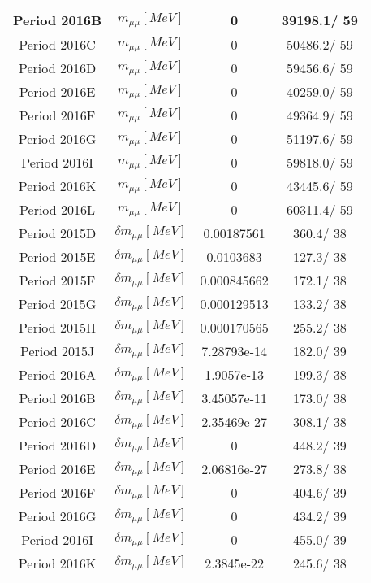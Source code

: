 \documentclass{article}
\begin{document}
\begin{longtable}{c|c|c|c}
\hline
 Period 2016B & $m_{\mu\mu} [MeV]$ & 0 & 39198.1/ 59\\
\hline
 Period 2016C & $m_{\mu\mu} [MeV]$ & 0 & 50486.2/ 59\\
\hline
 Period 2016D & $m_{\mu\mu} [MeV]$ & 0 & 59456.6/ 59\\
\hline
 Period 2016E & $m_{\mu\mu} [MeV]$ & 0 & 40259.0/ 59\\
\hline
 Period 2016F & $m_{\mu\mu} [MeV]$ & 0 & 49364.9/ 59\\
\hline
 Period 2016G & $m_{\mu\mu} [MeV]$ & 0 & 51197.6/ 59\\
\hline
 Period 2016I & $m_{\mu\mu} [MeV]$ & 0 & 59818.0/ 59\\
\hline
 Period 2016K & $m_{\mu\mu} [MeV]$ & 0 & 43445.6/ 59\\
\hline
 Period 2016L & $m_{\mu\mu} [MeV]$ & 0 & 60311.4/ 59\\
\hline
 Period 2015D & $\delta m_{\mu\mu} [MeV]$ & 0.00187561 & 360.4/ 38\\
\hline
 Period 2015E & $\delta m_{\mu\mu} [MeV]$ & 0.0103683 & 127.3/ 38\\
\hline
 Period 2015F & $\delta m_{\mu\mu} [MeV]$ & 0.000845662 & 172.1/ 38\\
\hline
 Period 2015G & $\delta m_{\mu\mu} [MeV]$ & 0.000129513 & 133.2/ 38\\
\hline
 Period 2015H & $\delta m_{\mu\mu} [MeV]$ & 0.000170565 & 255.2/ 38\\
\hline
 Period 2015J & $\delta m_{\mu\mu} [MeV]$ & 7.28793e-14 & 182.0/ 39\\
\hline
 Period 2016A & $\delta m_{\mu\mu} [MeV]$ & 1.9057e-13 & 199.3/ 38\\
\hline
 Period 2016B & $\delta m_{\mu\mu} [MeV]$ & 3.45057e-11 & 173.0/ 38\\
\hline
 Period 2016C & $\delta m_{\mu\mu} [MeV]$ & 2.35469e-27 & 308.1/ 38\\
\hline
 Period 2016D & $\delta m_{\mu\mu} [MeV]$ & 0 & 448.2/ 39\\
\hline
 Period 2016E & $\delta m_{\mu\mu} [MeV]$ & 2.06816e-27 & 273.8/ 38\\
\hline
 Period 2016F & $\delta m_{\mu\mu} [MeV]$ & 0 & 404.6/ 39\\
\hline
 Period 2016G & $\delta m_{\mu\mu} [MeV]$ & 0 & 434.2/ 39\\
\hline
 Period 2016I & $\delta m_{\mu\mu} [MeV]$ & 0 & 455.0/ 39\\
\hline
 Period 2016K & $\delta m_{\mu\mu} [MeV]$ & 2.3845e-22 & 245.6/ 38\\

\end{longtable}
\end{document}
